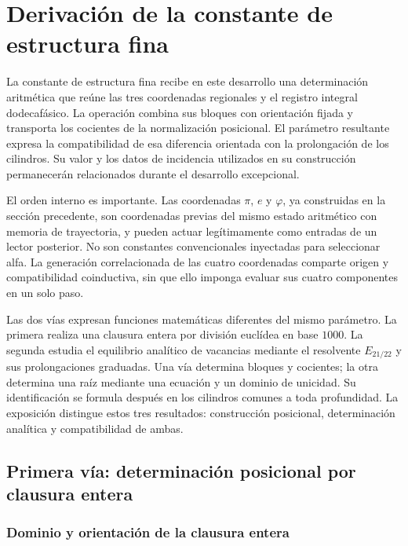 \section{Derivación de la constante de estructura fina}
\label{x_reciprocidad:sec:alpha}

La constante de estructura fina recibe en este desarrollo una determinación
aritmética que reúne las tres coordenadas regionales y el registro integral
dodecafásico. La operación combina sus bloques con orientación fijada y
transporta los cocientes de la normalización posicional. El parámetro
resultante expresa la compatibilidad de esa diferencia orientada con
la prolongación de los cilindros. Su valor y los datos de incidencia
utilizados en su construcción permanecerán relacionados durante el
desarrollo excepcional.

El orden interno es importante. Las coordenadas \(\pi\),
\(e\) y \(\varphi\), ya construidas en la sección precedente, son coordenadas
previas del mismo estado aritmético con memoria de trayectoria, y pueden actuar legítimamente como
entradas de un lector posterior. No son constantes convencionales
inyectadas para seleccionar alfa. La generación correlacionada de las cuatro coordenadas comparte origen y
compatibilidad coinductiva, sin que ello imponga evaluar sus cuatro
componentes en un solo paso.

Las dos vías expresan funciones matemáticas diferentes del mismo parámetro.
La primera realiza una clausura entera por división euclídea en base
\(1000\). La segunda estudia el equilibrio analítico de vacancias mediante
el resolvente \(E_{21/22}\) y sus prolongaciones graduadas. Una vía
determina bloques y cocientes; la otra determina una raíz mediante una
ecuación y un dominio de unicidad. Su identificación se formula después
en los cilindros comunes a toda profundidad. La exposición distingue
estos tres resultados: construcción posicional, determinación analítica
y compatibilidad de ambas.

\subsection{Primera vía: determinación posicional por clausura entera}
\subsubsection{Dominio y orientación de la clausura entera}
\label{x_reciprocidad:subsec:alpha-dominio}

